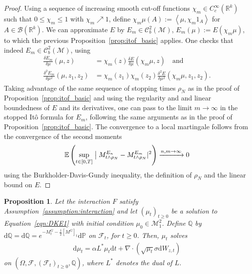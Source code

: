 \documentclass{article}
\newcommand{\dd}{\text{d}}
\newcommand{\av}[1]{\left<#1\right>}
\newtheorem{proposition}[theorem]{Proposition}
\renewcommand{\P}{\mathbb{P}}
\newcommand{\R}{\mathbb{R}}
\newcommand{\E}{\mathbb{E}}
\newcommand{\F}{F}
\newcommand{\C}{\mathcal C}
\newcommand{\cM}{\mathcal M}
\begin{document}
\begin{proof} Using a sequence of increasing smooth cut-off functions $\chi_m\in C^\infty_c(\R^k)$ such that
  $0\leq \chi_m\leq 1 $ with $\chi_m \nearrow 1$, define $\chi_m \mu(A) := \av{\mu, \chi_m 1_A}$ for
  $A \in \mathcal{B}(\R^k)$.  We can approximate $E$ by $E_m\in \C^2_b(\cM)$, $E_m(\mu):=E(\chi_m\mu)$, to
  which the previous Proposition~\ref{prop:itof_basic} applies. One checks that indeed $E_m\in \C^2_b(\cM)$,
  using
\begin{align*}
	\frac{\delta E_m}{\delta \mu}(\mu, z) &= \chi_m(z) \frac{\delta E }{\delta \mu}(\chi_m \mu, z) \quad \text{and}\\
	\frac{\delta^ 2 E_m}{\delta \mu^2}(\mu, z_1, z_2) &= \chi_m(z_1)\chi_m(z_2) \frac{\delta^ 2 E }{\delta \mu^ 2}(\chi_m \mu, z_1, z_2). 
\end{align*}
Taking advantage of the same sequence of stopping times $\rho_N$ as in the proof of
Proposition~\ref{prop:itof_basic} and using the regularity and and linear boundedness of $E$ and its
derivatives, one can pass to the limit $m\to \infty$ in the stopped It\^o formula for $E_m$, following the
same arguments as in the proof of Proposition~\ref{prop:itof_basic}. The convergence to a local martingale
follows from the convergence of the second moments
\begin{align*}
\E\left( \sup_{t \in [0,T]}  \bigm| M_{t \wedge \rho_N}^{E_n} - M_{t \wedge \rho_N}^{E_m}|^2\right) %
\xrightarrow{n,m \to \infty} 0
\end{align*}
using the Burkholder-Davis-Gundy inequality, the definition of $\rho_N$ and the linear bound on $E$.
\end{proof}

\begin{proposition}
  \label{prop:girsanovfordke}
  Let the interaction $\F$ satisfy Assumption~\ref{assumption:interaction} and let $(\mu_t)_{t \geq 0}$ be a
  solution to Equation~\eqref{eqn:DKE1} with initial condition $\mu_0 \in \mathcal M^2_1$.  Define $\mathbb Q$
  by $\dd \mathbb Q = \dd \mathbb Q = e^{-M^G_t - \frac{1}{2}[M^G]_t} \dd \P$ on $\mathcal F_t$, for
  $t \geq 0$. Then, $\mu_t$ solves
  \begin{align*}
    \dd \mu_t = \alpha L^* \mu_t \dd t + \nabla \cdot \left(\sqrt{\mu_t} \sigma \dd W_{z,t}\right)
  \end{align*}
  on $(\Omega, \mathcal F, (\mathcal F_t)_{t \geq 0}, \mathbb Q)$, where $L^*$ denotes the dual of $L$.       \label{prop:Girsanov}
\end{proposition}
\end{document}
